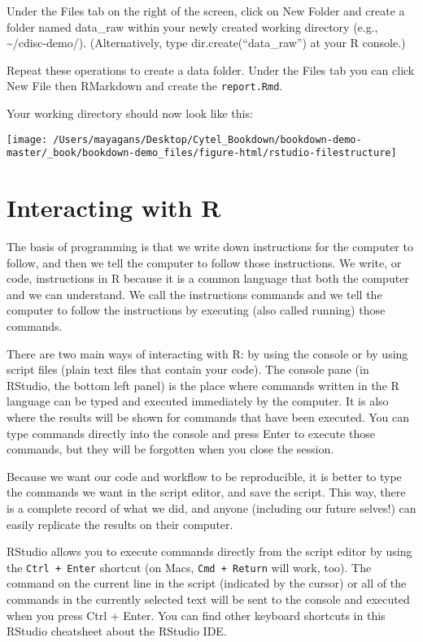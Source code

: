 \documentclass[]{book}
\begin{document}
Under the Files tab on the right of the screen, click on New Folder and
create a folder named data\_raw within your newly created working
directory (e.g., \textasciitilde{}/cdisc-demo/). (Alternatively, type
dir.create(``data\_raw'') at your R console.)

Repeat these operations to create a data folder. Under the Files tab you
can click New File then RMarkdown and create the \texttt{report.Rmd}.

Your working directory should now look like this:

\begin{center}\texttt{[image: /Users/mayagans/Desktop/Cytel\_Bookdown/bookdown-demo-master/\_book/bookdown-demo\_files/figure-html/rstudio-filestructure]} \end{center}

\chapter{Interacting with R}\label{interacting-with-r}

The basis of programming is that we write down instructions for the
computer to follow, and then we tell the computer to follow those
instructions. We write, or code, instructions in R because it is a
common language that both the computer and we can understand. We call
the instructions commands and we tell the computer to follow the
instructions by executing (also called running) those commands.

There are two main ways of interacting with R: by using the console or
by using script files (plain text files that contain your code). The
console pane (in RStudio, the bottom left panel) is the place where
commands written in the R language can be typed and executed immediately
by the computer. It is also where the results will be shown for commands
that have been executed. You can type commands directly into the console
and press Enter to execute those commands, but they will be forgotten
when you close the session.

Because we want our code and workflow to be reproducible, it is better
to type the commands we want in the script editor, and save the script.
This way, there is a complete record of what we did, and anyone
(including our future selves!) can easily replicate the results on their
computer.

RStudio allows you to execute commands directly from the script editor
by using the \texttt{Ctrl\ +\ Enter} shortcut (on Macs,
\texttt{Cmd\ +\ Return} will work, too). The command on the current line
in the script (indicated by the cursor) or all of the commands in the
currently selected text will be sent to the console and executed when
you press Ctrl + Enter. You can find other keyboard shortcuts in this
RStudio cheatsheet about the RStudio IDE.
\end{document}
